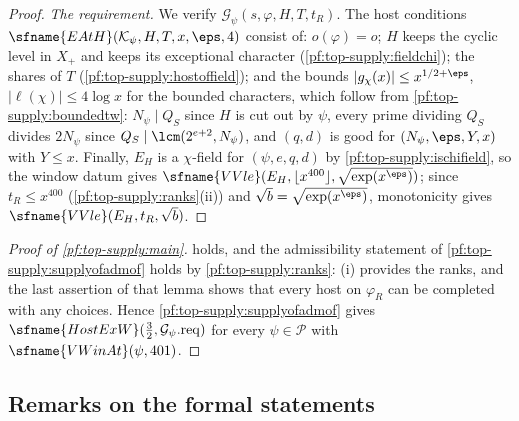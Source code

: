 \begin{proof}
\emph{The requirement.} We verify $\mathcal G_\psi(s,\varphi,H,T,t_R)$. The host conditions
$\sfname{EAtH}(\mathcal K_\psi,H,T,x,\eps,4)$ consist of: $o(\varphi)=o$; $H$ keeps the cyclic level in $X_+$ and keeps its
exceptional character (\cref{pf:top-supply:fieldchi}); the shares of $T$ (\cref{pf:top-supply:hostoffield}); and the bounds
$|g_\chi(x)|\le x^{1/2+\eps}$, $|\ell(\chi)|\le4\log x$ for the bounded characters, which follow from
\cref{pf:top-supply:boundedtw}: $N_\psi\mid Q_S$ since $H$ is cut out by $\psi$, every prime dividing $Q_S$ divides
$2N_\psi$ since $Q_S\mid\lcm(2^{e+2},N_\psi)$, and $(q,d)$ is good for $(N_\psi,\eps,Y,x)$ with $Y\le x$. Finally, $E_H$ is a
$\chi$-field for $(\psi,e,q,d)$ by \cref{pf:top-supply:ischifield}, so the window datum gives
$\sfname{VVle}(E_H,\lfloor x^{400}\rfloor,\sqrt{\exp(x^\eps)})$; since $t_R\le x^{400}$ (\cref{pf:top-supply:ranks}(ii)) and
$\sqrt b=\sqrt{\exp(x^\eps)}$, monotonicity gives $\sfname{VVle}(E_H,t_R,\sqrt b)$.
\end{proof}

\begin{proof}[Proof of \cref{pf:top-supply:main}]
 holds, and the admissibility statement of \cref{pf:top-supply:supplyofadmof} holds by
\cref{pf:top-supply:ranks}: (i) provides the ranks, and the last assertion of that lemma shows that every host on $\varphi_R$
can be completed with any choices. Hence \cref{pf:top-supply:supplyofadmof} gives $\sfname{HostExW}(\frac32,\mathcal
G_\psi.\mathrm{req})$ for every $\psi\in\mathcal P$ with $\sfname{VWinAt}(\psi,401)$.
\end{proof}

\subsection{Remarks on the formal statements}\label{sec:pf:top-supply:remarks}


